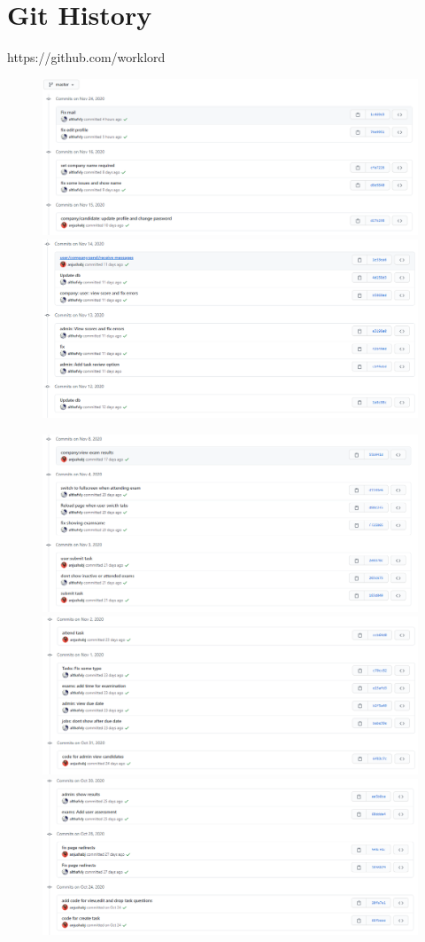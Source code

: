 \documentclass[a4paper,12pt]{report}
\begin{document}
\pagebreak


\section{Git History}

https://github.com/worklord

\begin{figure}[bph]
	\centering
	\includegraphics[width=.8\linewidth]{img/screenshots/git/1}
	\includegraphics[width=.8\linewidth]{img/screenshots/git/2}
\end{figure}
\begin{figure}[bph]
	\centering
	\includegraphics[width=.8\linewidth]{img/screenshots/git/3}
	\includegraphics[width=.8\linewidth]{img/screenshots/git/4}
	\includegraphics[width=.8\linewidth]{img/screenshots/git/5}
\end{figure}
\end{document}
